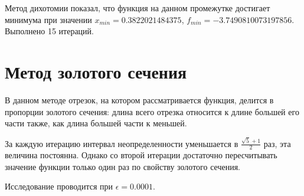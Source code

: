 \documentclass[12pt]{article}
\begin{document}
Метод дихотомии показал, что функция на данном промежутке достигает минимума при значении $x_{min} = 0.3822021484375$, $f_{min} = -3.7490810073197856$. Выполнено 15 итераций.

\newpage
\section{Метод золотого сечения}

В данном методе отрезок, на котором рассматривается функция, делится в пропорции золотого сечения: длина всего отрезка относится к длине большей его части также, как длина большей части к меньшей.

За каждую итерацию интервал неопределенности уменьшается в $\frac{\sqrt{5}+1}{2}$ раз, эта величина постоянна. Однако со второй итерации достаточно пересчитывать значение функции только один раз по свойству золотого сечения.

Исследование проводится при $\epsilon = 0.0001$.
\end{document}
